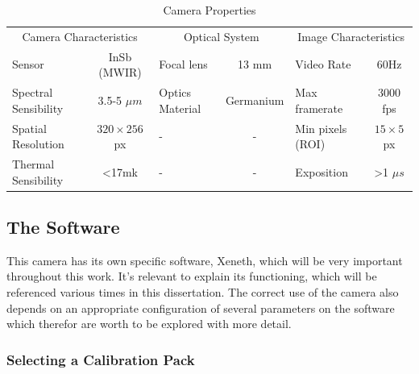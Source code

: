 \begin{table}[h]
\centering
\caption{Camera Properties}
\label{tab:camprop}
\begin{tabular}{lclclc}
\toprule
\multicolumn{2}{c}{Camera Characteristics} & \multicolumn{2}{c}{Optical System} & \multicolumn{2}{c}{Image Characteristics} \\
\cmidrule[0.4pt](r{0.125em}){1-2}%
\cmidrule[0.4pt](r{0.125em}){3-4}%
\cmidrule[0.4pt](r{0.125em}){5-6}%
Sensor                 & InSb (MWIR)       & Focal lens          & 13 mm        & Video Rate         & 60Hz                 \\
Spectral Sensibility   & 3.5-5 $\mu m$     & Optics Material     & Germanium    & Max framerate      & 3000 fps             \\
Spatial Resolution     & $320 \times 256$ px &  -                  & -            & Min pixels (ROI)   & $15 \times 5$ px        \\
Thermal Sensibility    & \textless17mk     &   -                 &   -          & Exposition         & \textgreater 1 $\mu s$  \\ \bottomrule
\end{tabular}
\end{table}


\subsection{The Software}

\par This camera has its own specific software, Xeneth, which will be very important throughout this work. It's relevant to explain its functioning, which will be referenced various times in this dissertation. The correct use of the camera also depends on an appropriate configuration of several parameters on the software which therefor are worth to be explored with more detail.

\subsubsection{Selecting a Calibration Pack}

